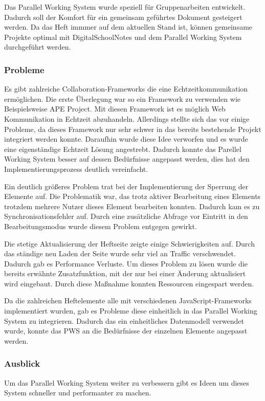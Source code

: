 Das Parallel Working System wurde speziell für Gruppenarbeiten entwickelt. Dadurch soll der Komfort für ein gemeinsam geführtes Dokument gesteigert werden. Da das Heft immmer auf dem aktuellen Stand ist, können gemeinsame Projekte optimal mit DigitalSchoolNotes und dem Parallel Working System  durchgeführt werden. 
 
\subsubsection{Probleme}
Es gibt zahlreiche Collaboration-Frameworks die eine Echtzeitkommunikation ermöglichen. Die erste Überlegung war so ein Framework zu verwenden wie Beispielsweise APE Project\cite{APE}. Mit diesen Framework ist es möglich Web Kommunikation in Echtzeit abzuhandeln. Allerdings stellte sich das vor einige Probleme, da dieses Framework nur sehr schwer in das bereits bestehende Projekt integriert werden konnte. Daraufhin wurde diese Idee verworfen und es wurde eine eigenständige Echtzeit Lösung angestrebt. Dadurch konnte das Parellel Working System besser auf dessen Bedürfnisse angepasst werden, dies hat den Implementierungsprozess deutlich vereinfacht.

Ein deutlich größeres Problem trat bei der Implementierung der Sperrung der Elemente auf. Die Problematik war, das trotz aktiver Bearbeitung eines Elements trotzdem mehrere Nutzer dieses Element bearbeiten konnten. Dadurch kam es zu Synchronisationsfehler auf. Durch eine zusätzliche Abfrage vor Eintritt in den Bearbeitungsmodus wurde diesem Problem entgegen gewirkt. 

Die stetige Aktualisierung der Heftseite zeigte einige Schwierigkeiten auf. Durch das ständige neu Laden der Seite wurde sehr viel an Traffic verschwendet. Dadurch gab es Performance Verluste. Um dieses Problem zu lösen wurde die bereits erwähnte Zusatzfunktion, mit der nur bei einer Änderung aktualisiert wird eingebaut. Durch diese Maßnahme konnten Ressourcen eingespart werden.

Da die zahlreichen Heftelemente alle mit verschiedenen JavaScript-Frameworks implementiert wurden, gab es Probleme diese einheitlich in das Parallel Working System zu integrieren. Dadurch das ein einheitliches Datenmodell verwendet wurde, konnte das PWS an die Bedürfnisse der einzelnen Elemente angepasst werden. 
\subsubsection{Ausblick}
Um das Parallel Working System weiter zu verbessern gibt es Ideen um dieses System schneller und performanter zu machen.

